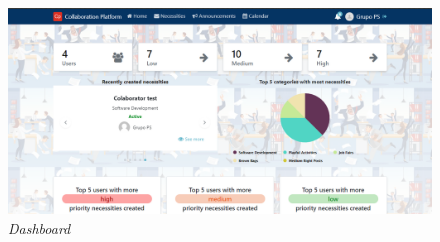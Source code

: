 \begin{figure}[H]
  \centering 
  \includegraphics[scale=0.4]{figures/Dashboard.png}
  \caption{\textit{Dashboard}}\label{fig:Dashboard}
\end{figure}

\newpage

